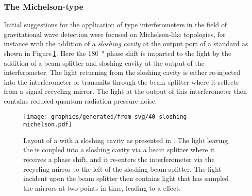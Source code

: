 \subsubsection{The Michelson-type \SM{}}
Initial suggestions for the application of \SM{} type interferometers in the field of gravitational wave detection were focused on Michelson-like topologies, for instance with the addition of a \emph{sloshing cavity} at the output port of a standard \FPMI{} \cite{Braginsky2000, Purdue2002} as shown in Figure\,\ref{fig:sloshing-michelson}. Here the \SI{180}{\degree} phase shift is imparted to the light by the addition of a beam splitter and sloshing cavity at the output of the interferometer. The light returning from the sloshing cavity is either re-injected into the interferometer or transmits through the beam splitter where it reflects from a signal recycling mirror. The light at the output of this interferometer then contains reduced quantum radiation pressure noise.

\begin{figure}
  \centering
  \texttt{[image: graphics/generated/from-svg/40-sloshing-michelson.pdf]}
  \caption[Layout of a \FPMI{} with a sloshing cavity]{\label{fig:sloshing-michelson}Layout of a \FPMI{} with a sloshing cavity as presented in \cite{Purdue2002}. The light leaving the \FPMI{} is coupled into a sloshing cavity via a beam splitter where it receives a phase shift, and it re-enters the interferometer via the recycling mirror to the left of the sloshing beam splitter. The light incident upon the beam splitter then contains light that has sampled the mirrors at two points in time, leading to a \SM{} effect.}
\end{figure}

